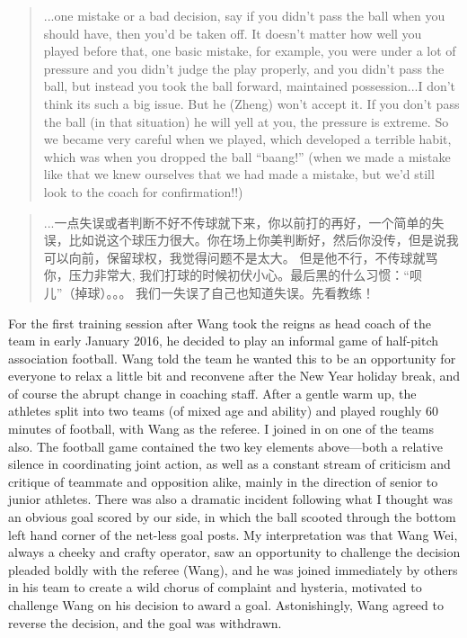   \begin{quotation}
    ...one mistake or a bad decision, say if you didn't pass the ball when you should have, then you'd be taken off.  It doesn't matter how well you played before that, one basic mistake, for example, you were under a lot of pressure and you didn't judge the play properly, and you didn't pass the ball, but instead you took the ball forward, maintained possession...I don't think its such a big issue.
    But he (Zheng) won't accept it.  If you don't pass the ball (in that situation) he will yell at you, the pressure is extreme.  So we became very careful when we played, which developed a terrible habit, which was when you dropped the ball ``baang!'' (when we made a mistake like that we knew ourselves that we had made a mistake, but we'd still look to the coach for confirmation!!)
  \end{quotation}

  \begin{quotation}
    ...一点失误或者判断不好不传球就下来，你以前打的再好，一个简单的失误，比如说这个球压力很大。你在场上你美判断好，然后你没传，但是说我可以向前，保留球权，我觉得问题不是太大。
    但是他不行，不传球就骂你，压力非常大, 我们打球的时候初伏小心。最后黑的什么习惯：“呗儿”（掉球）。。。 我们一失误了自己也知道失误。先看教练！
  \end{quotation}



  For the first training session after Wang took the reigns as head coach of the team in early January 2016, he decided to play an informal game of half-pitch association football.  Wang told the team he wanted this to be an opportunity for everyone to relax a little bit and reconvene after the New Year holiday break, and of course the abrupt change in coaching staff. After a gentle warm up, the athletes split into two teams (of mixed age and ability) and played roughly 60 minutes of football, with Wang as the referee.  I joined in on one of the teams also.  The football game contained the two key elements above---both a relative silence in coordinating joint action, as well as a constant stream of criticism and critique of teammate and opposition alike, mainly in the direction of senior to junior athletes.  There was also a dramatic incident following what I thought was an obvious goal scored by our side, in which the ball scooted through the bottom left hand corner of the net-less goal posts. My interpretation was that Wang Wei, always a cheeky and crafty operator, saw an opportunity to challenge the decision  pleaded boldly with the referee (Wang), and he was joined immediately by others in his team to create a wild chorus of complaint and hysteria, motivated to challenge Wang on his decision to award a goal.  Astonishingly, Wang agreed to reverse the decision, and the goal was withdrawn.

